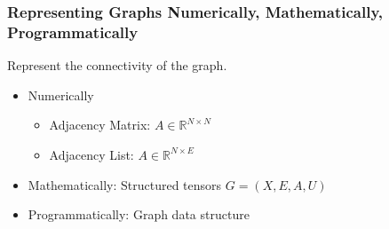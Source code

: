 \subsubsection{Representing Graphs Numerically, Mathematically, Programmatically}
\begin{notes} Represent the connectivity of the graph.
    \begin{itemize}
        \item Numerically 
        \begin{itemize}
            \item Adjacency Matrix: $A \in \mathbb{R}^{N \times N}$
            \item Adjacency List: $A \in \mathbb{R}^{N \times E}$
        \end{itemize}
        \item Mathematically: Structured tensors $G = (X,E,A,U)$
        \item Programmatically: Graph data structure
    \end{itemize}
\end{notes}
\newpage

